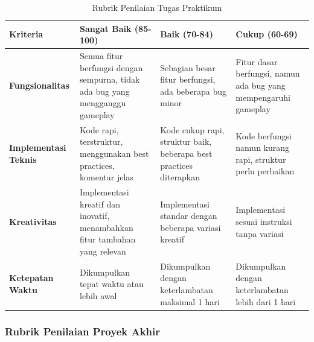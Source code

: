 \documentclass[a4paper,12pt]{article}
\begin{document}
\begin{table}[h]
\centering
\caption{Rubrik Penilaian Tugas Praktikum}
\label{tab:rubrik_tugas}
\small
\begin{tabular}{|p{2cm}|p{3.5cm}|p{3.5cm}|p{3.5cm}|}
\hline
\textbf{Kriteria} & \textbf{Sangat Baik (85-100)} & \textbf{Baik (70-84)} & \textbf{Cukup (60-69)} \\
\hline
\textbf{Fungsionalitas} & Semua fitur berfungsi dengan sempurna, tidak ada bug yang mengganggu gameplay & Sebagian besar fitur berfungsi, ada beberapa bug minor & Fitur dasar berfungsi, namun ada bug yang mempengaruhi gameplay \\
\hline
\textbf{Implementasi Teknis} & Kode rapi, terstruktur, menggunakan best practices, komentar jelas & Kode cukup rapi, struktur baik, beberapa best practices diterapkan & Kode berfungsi namun kurang rapi, struktur perlu perbaikan \\
\hline
\textbf{Kreativitas} & Implementasi kreatif dan inovatif, menambahkan fitur tambahan yang relevan & Implementasi standar dengan beberapa variasi kreatif & Implementasi sesuai instruksi tanpa variasi \\
\hline
\textbf{Ketepatan Waktu} & Dikumpulkan tepat waktu atau lebih awal & Dikumpulkan dengan keterlambatan maksimal 1 hari & Dikumpulkan dengan keterlambatan lebih dari 1 hari \\
\hline
\end{tabular}
\end{table}

\subsubsection{Rubrik Penilaian Proyek Akhir}
\end{document}
